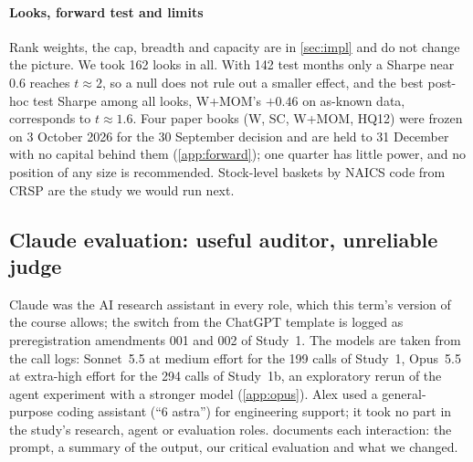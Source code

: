 \paragraph{Looks, forward test and limits} Rank weights, the cap, breadth and capacity are in \cref{sec:impl} and do not change the picture. We took 162 looks in all. %
With 142 test months only a Sharpe near 0.6 reaches $t\approx2$, so a null does not rule out a smaller effect, and the best post-hoc test Sharpe among all looks, W+MOM's $+0.46$ on as-known data, corresponds to $t\approx1.6$. %
Four paper books (W, SC, W+MOM, HQ12) were frozen on 3 October 2026 for the 30 September decision and are held to 31 December with no capital behind them (\cref{app:forward}); one quarter has little power, and no position of any size is recommended. %
Stock-level baskets by NAICS code from CRSP are the study we would run next.

\subsection{Claude evaluation: useful auditor, unreliable judge}\label{sec:claude}

Claude was the AI research assistant in every role, which this term's version of the course allows; the switch from the ChatGPT template is logged as preregistration amendments 001 and 002 of Study~1. The models are taken from the call logs: Sonnet~5.5 at medium effort for the 199 calls of Study~1, Opus~5.5 at extra-high effort for the 294 calls of Study~1b, an exploratory rerun of the agent experiment with a stronger model (\cref{app:opus}). %
Alex used a general-purpose coding assistant (``6 astra'') for engineering support; it took no part in the study's research, agent or evaluation roles. %
 documents each interaction: the prompt, a summary of the output, our critical evaluation and what we changed.

